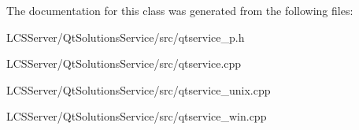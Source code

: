 The documentation for this class was generated from the following files\+:\begin{DoxyCompactItemize}
\item 
L\+C\+S\+Server/\+Qt\+Solutions\+Service/src/qtservice\+\_\+p.\+h\item 
L\+C\+S\+Server/\+Qt\+Solutions\+Service/src/qtservice.\+cpp\item 
L\+C\+S\+Server/\+Qt\+Solutions\+Service/src/qtservice\+\_\+unix.\+cpp\item 
L\+C\+S\+Server/\+Qt\+Solutions\+Service/src/qtservice\+\_\+win.\+cpp\end{DoxyCompactItemize}
